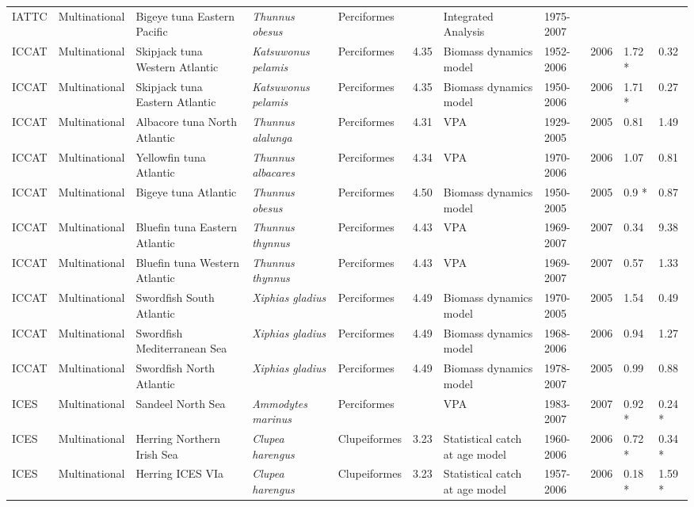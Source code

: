 \begin{longtable}{p{1.5cm}p{1.5cm}p{3cm}p{3cm}p{2.5cm}p{0.9cm}p{1.4cm}p{0.9cm}p{0.9cm}p{0.9cm}p{1cm}}
  IATTC & Multinational & Bigeye tuna Eastern Pacific & \textit{Thunnus obesus} & Perciformes &  & Integrated Analysis & 1975-2007 &  &  &  \\ 
  ICCAT & Multinational & Skipjack tuna Western Atlantic & \textit{Katsuwonus pelamis} & Perciformes & 4.35 & Biomass dynamics model & 1952-2006 & 2006 & 1.72 * & 0.32 \\ 
  ICCAT & Multinational & Skipjack tuna Eastern Atlantic & \textit{Katsuwonus pelamis} & Perciformes & 4.35 & Biomass dynamics model & 1950-2006 & 2006 & 1.71 * & 0.27 \\ 
  ICCAT & Multinational & Albacore tuna North Atlantic & \textit{Thunnus alalunga} & Perciformes & 4.31 & VPA & 1929-2005 & 2005 & 0.81 & 1.49 \\ 
  ICCAT & Multinational & Yellowfin tuna Atlantic & \textit{Thunnus albacares} & Perciformes & 4.34 & VPA & 1970-2006 & 2006 & 1.07 & 0.81 \\ 
  ICCAT & Multinational & Bigeye tuna Atlantic & \textit{Thunnus obesus} & Perciformes & 4.50 & Biomass dynamics model & 1950-2005 & 2005 & 0.9 * & 0.87 \\ 
  ICCAT & Multinational & Bluefin tuna Eastern Atlantic & \textit{Thunnus thynnus} & Perciformes & 4.43 & VPA & 1969-2007 & 2007 & 0.34 & 9.38 \\ 
  ICCAT & Multinational & Bluefin tuna Western Atlantic & \textit{Thunnus thynnus} & Perciformes & 4.43 & VPA & 1969-2007 & 2007 & 0.57 & 1.33 \\ 
  ICCAT & Multinational & Swordfish South Atlantic & \textit{Xiphias gladius} & Perciformes & 4.49 & Biomass dynamics model & 1970-2005 & 2005 & 1.54 & 0.49 \\ 
  ICCAT & Multinational & Swordfish Mediterranean Sea & \textit{Xiphias gladius} & Perciformes & 4.49 & Biomass dynamics model & 1968-2006 & 2006 & 0.94 & 1.27 \\ 
  ICCAT & Multinational & Swordfish North Atlantic & \textit{Xiphias gladius} & Perciformes & 4.49 & Biomass dynamics model & 1978-2007 & 2005 & 0.99 & 0.88 \\ 
  ICES & Multinational & Sandeel North Sea & \textit{Ammodytes marinus} & Perciformes &  & VPA & 1983-2007 & 2007 & 0.92 * & 0.24 * \\ 
  ICES & Multinational & Herring Northern Irish Sea & \textit{Clupea harengus} & Clupeiformes & 3.23 & Statistical catch at age model & 1960-2006 & 2006 & 0.72 * & 0.34 * \\ 
  ICES & Multinational & Herring ICES VIa & \textit{Clupea harengus} & Clupeiformes & 3.23 & Statistical catch at age model & 1957-2006 & 2006 & 0.18 * & 1.59 * \\ 

\end{longtable}
